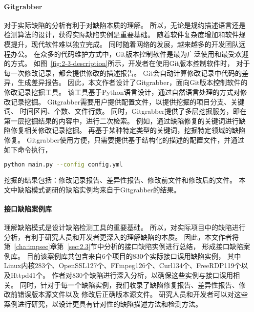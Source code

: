 \paragraph{Gitgrabber}
对于实际缺陷的分析有利于对缺陷本质的理解。
所以，无论是规约描述语言还是检测算法的设计，获得实际缺陷实例是重要基础。
随着软件复杂度增加和软件规模提升，现代软件难以独立完成。
同时随着网络的发展，越来越多的开发团队远程办公。
在众多的代码维护方式中，Git版本控制软件是最为广泛使用和最受欢迎的方式。
如图~\ref{fig:2-3-description}所示，开发者在使用Git版本控制软件时，
对于每一次修改记录，都会提供修改的描述报告。
Git会自动计算修改记录中代码的差异，生成差异报告。
因此，本文作者设计了Gitgrabber，面向Git版本控制软件的修改记录挖掘工具。
该工具基于Python语言设计，通过自然语言处理的方式对修改记录挖掘。
Gitgrabber需要用户提供配置文件，以提供挖掘的项目分支、关键词、
时间区间、个数、文件行数。
同时，Gitgrabber提供了多层挖掘服务，即在第一层挖掘结果的内容中，进行二次检索。
例如，通过缺陷修复的关键词进行缺陷修复相关修改记录挖掘。
再基于某种特定类型的关键词，挖掘特定领域的缺陷修复。
Gitgrabber使用方便，只需要提供基于结构化的描述的配置文件，并通过如下命令执行，
\begin{lstlisting}[language={bash},
basicstyle=\linespread{0.8}\listingsfont,
numbers=none,
xleftmargin=.3\textwidth]
python main.py --config config.yml
\end{lstlisting}
挖掘的结果包括：修改记录报告、差异性报告、修改前文件和修改后的文件。
本文中缺陷模式调研的缺陷实例均来自于Gitgrabber的结果。

\paragraph{接口缺陷案例库}
理解缺陷模式是设计缺陷检测工具的重要基础。
所以，对实际项目中的缺陷进行分析，有利于研究人员和开发者更深入的理解缺陷的本质。
因此，本文作者将第~\ref{cha:impsec}章第~\ref{sec:2.3}节中分析的接口缺陷实例进行总结，
形成接口缺陷案例库。
目前该案例库共包含来自6个项目的830个实际接口误用缺陷实例，
其中Linux内核283个、OpenSSL127个、FFmpeg126个、Curl134个、FreeRDP119个以及Httpd41个。
作者对830个缺陷进行深入分析，以确保这些实例与接口误用相关。
同时，针对于每一个缺陷实例，我们收录了缺陷修复报告、差异性报告、修改前错误版本源文件以及
修改后正确版本源文件。
研究人员和开发者可以对这些案例进行研究，以设计更具有针对性的缺陷描述方法和检测方法。

